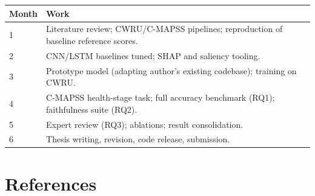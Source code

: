 \documentclass[10pt,a4paper]{article}
\begin{document}
{\small
\begin{tabularx}{\textwidth}{|p{1.6cm}|X|}
\hline
\rowcolor{lightgray} \textbf{Month} & \textbf{Work} \\
\hline
1 & Literature review; CWRU/C-MAPSS pipelines; reproduction of baseline reference scores. \\
\hline
2 & CNN/LSTM baselines tuned; SHAP and saliency tooling. \\
\hline
3 & Prototype model (adapting author's existing codebase); training on CWRU. \\
\hline
4 & C-MAPSS health-stage task; full accuracy benchmark (RQ1); faithfulness suite (RQ2). \\
\hline
5 & Expert review (RQ3); ablations; result consolidation. \\
\hline
6 & Thesis writing, revision, code release, submission. \\
\hline
\end{tabularx}}

\section{References}
\end{document}
